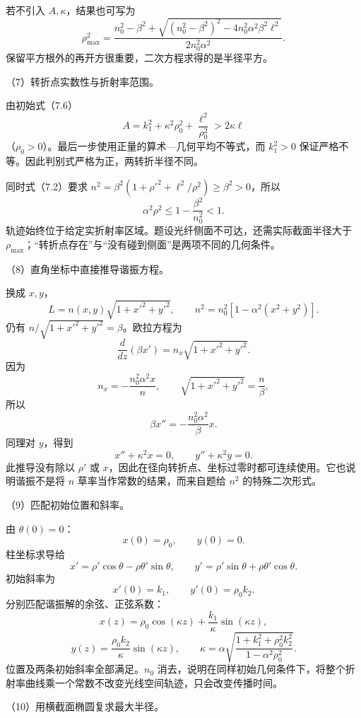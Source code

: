 \documentclass[12pt,a4paper,fontset=fandol]{ctexart}
\begin{document}
若不引入 \(A,\kappa\)，结果也可写为 \[
\rho_{\max}^2=
\frac{n_0^2-\beta^2+
\sqrt{(n_0^2-\beta^2)^2-4n_0^2\alpha^2\beta^2\ell^2}}
{2n_0^2\alpha^2}.
\] 保留平方根外的再开方很重要，二次方程求得的是半径平方。

（7）转折点实数性与折射率范围。

由初始式（7.6） \[
A=k_1^2+\kappa^2\rho_0^2+\frac{\ell^2}{\rho_0^2}
>2\kappa\ell
\] （\(\rho_0>0\)）。最后一步使用正量的算术---几何平均不等式，而
\(k_1^2>0\) 保证严格不等。因此判别式严格为正，两转折半径不同。

同时式（7.2）要求
\(n^2=\beta^2(1+\rho'^2+\ell^2/\rho^2)\ge\beta^2>0\)，所以 \[
\alpha^2\rho^2\le1-\frac{\beta^2}{n_0^2}<1.
\]
轨迹始终位于给定实折射率区域。题设光纤侧面不可达，还需实际截面半径大于
\(\rho_{\max}\)；``转折点存在''与``没有碰到侧面''是两项不同的几何条件。

（8）直角坐标中直接推导谐振方程。

换成 \(x,y\)， \[
L=n(x,y)\sqrt{1+x'^2+y'^2},
\qquad n^2=n_0^2[1-\alpha^2(x^2+y^2)].
\] 仍有 \(n/\sqrt{1+x'^2+y'^2}=\beta\)。欧拉方程为 \[
\frac{d}{dz}(\beta x')=n_x\sqrt{1+x'^2+y'^2}.
\] 因为 \[
n_x=-\frac{n_0^2\alpha^2x}{n},\qquad
\sqrt{1+x'^2+y'^2}=\frac n\beta,
\] 所以 \[
\beta x''=-\frac{n_0^2\alpha^2}{\beta}x.
\] 同理对 \(y\)，得到 \[
\boxed{x''+\kappa^2x=0,\qquad
y''+\kappa^2y=0.}\tag{7.8}
\] 此推导没有除以 \(\rho'\) 或
\(x\)，因此在径向转折点、坐标过零时都可连续使用。它也说明谐振不是将
\(n\) 草率当作常数的结果，而来自题给 \(n^2\) 的特殊二次形式。

（9）匹配初始位置和斜率。

由 \(\theta(0)=0\)： \[
x(0)=\rho_0,\qquad y(0)=0.
\] 柱坐标求导给 \[
x'=\rho'\cos\theta-\rho\theta'\sin\theta,\qquad
y'=\rho'\sin\theta+\rho\theta'\cos\theta.
\] 初始斜率为 \[
x'(0)=k_1,\qquad y'(0)=\rho_0k_2.
\] 分别匹配谐振解的余弦、正弦系数： \[
\boxed{x(z)=\rho_0\cos(\kappa z)
+\frac{k_1}{\kappa}\sin(\kappa z),}\tag{7.9}
\] \[
\boxed{y(z)=\frac{\rho_0k_2}{\kappa}\sin(\kappa z),\qquad
\kappa=\alpha\sqrt{\frac{1+k_1^2+\rho_0^2k_2^2}
{1-\alpha^2\rho_0^2}}.}\tag{7.10}
\] 位置及两条初始斜率全部满足。\(n_0\)
消去，说明在同样初始几何条件下，将整个折射率曲线乘一个常数不改变光线空间轨迹，只会改变传播时间。

（10）用横截面椭圆复求最大半径。
\end{document}
